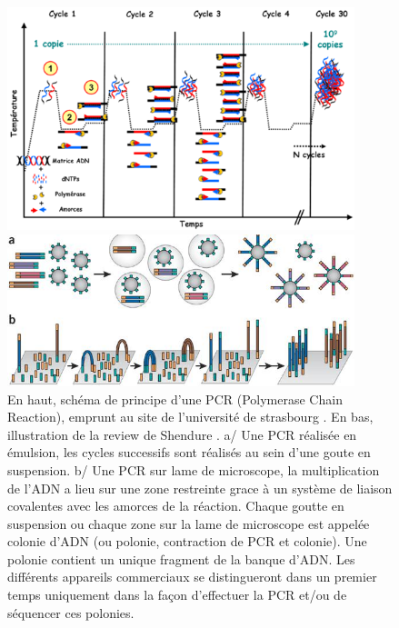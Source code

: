  \begin{figure}[H]
\begin{center}
\includegraphics[width=0.9\textwidth]{pcr.png}

\vspace{0.5cm}

\includegraphics[width=0.9\textwidth]{bridgepcr.jpg}
\vspace{0.5cm}

\caption[PCR]{En haut, schéma de principe d'une PCR (Polymerase Chain Reaction), emprunt au site de l'université de strasbourg \cite{pcrjpg}. En bas, illustration de la review de Shendure \cite{Shendure2008}. a/ Une PCR réalisée en émulsion, les cycles successifs sont réalisés au sein d'une goute en suspension. b/ Une PCR sur lame de microscope, la multiplication de l'ADN a lieu sur une zone restreinte grace à un système de liaison covalentes avec les amorces de la réaction. Chaque goutte en suspension ou chaque zone sur la lame de microscope est appelée colonie d'ADN (ou polonie, contraction de PCR et colonie). Une polonie contient un unique fragment de la banque d'ADN. Les différents appareils commerciaux se distingueront dans un premier temps uniquement dans la façon d'effectuer la PCR et/ou de séquencer ces polonies.}
\label{pcr}
\end{center}
\end{figure}



